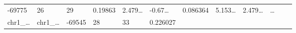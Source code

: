 \documentclass[
]{article}
\begin{document}
\begin{longtable}[]{@{}llllllllllll@{}}
\begin{minipage}[t]{0.06\columnwidth}
-69775\strut
\end{minipage} & \begin{minipage}[t]{0.06\columnwidth}\raggedright
26\strut
\end{minipage} & \begin{minipage}[t]{0.06\columnwidth}\raggedright
29\strut
\end{minipage} & \begin{minipage}[t]{0.06\columnwidth}\raggedright
0.19863\strut
\end{minipage} & \begin{minipage}[t]{0.08\columnwidth}\raggedright
2.479\ldots{}\strut
\end{minipage} & \begin{minipage}[t]{0.06\columnwidth}\raggedright
-0.67\ldots{}\strut
\end{minipage} & \begin{minipage}[t]{0.06\columnwidth}\raggedright
0.086364\strut
\end{minipage} & \begin{minipage}[t]{0.09\columnwidth}\raggedright
5.153\ldots{}\strut
\end{minipage} & \begin{minipage}[t]{0.06\columnwidth}\raggedright
2.479\ldots{}\strut
\end{minipage} & \begin{minipage}[t]{0.02\columnwidth}\raggedright
\ldots{}\strut
\end{minipage}\tabularnewline
\begin{minipage}[t]{0.06\columnwidth}\raggedright
chr1\_\ldots{}\strut
\end{minipage} & \begin{minipage}[t]{0.06\columnwidth}\raggedright
chr1\_\ldots{}\strut
\end{minipage} & \begin{minipage}[t]{0.06\columnwidth}\raggedright
-69545\strut
\end{minipage} & \begin{minipage}[t]{0.06\columnwidth}\raggedright
28\strut
\end{minipage} & \begin{minipage}[t]{0.06\columnwidth}\raggedright
33\strut
\end{minipage} & \begin{minipage}[t]{0.06\columnwidth}\raggedright
0.226027\strut
\end{minipage} & \begin{minipage}[t]{0.08\columnwidth}\raggedright

\end{minipage}
\end{longtable}
\end{document}

